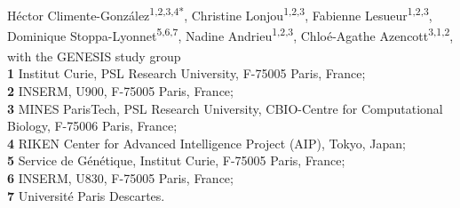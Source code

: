\documentclass[10pt,letterpaper]{article}
\providecommand{\DIFaddbegin}{} %
\providecommand{\DIFaddend}{} %
\providecommand{\DIFdelbegin}{} %
\providecommand{\DIFdelend}{} %
\newcommand{\DIFscaledelfig}{0.5}
\newlength{\DIFdelgraphicswidth} %
\newlength{\DIFdelgraphicsheight} %
\newcommand{\DIFaddincludegraphics}[2][]{{\color{blue}\fbox{\DIFOincludegraphics[#1]{#2}}}} %
\newcommand{\DIFdelincludegraphics}[2][]{%
\sbox{\DIFdelgraphicsbox}{\DIFOincludegraphics[#1]{#2}}%
\settoboxwidth{\DIFdelgraphicswidth}{\DIFdelgraphicsbox} %
\settoboxtotalheight{\DIFdelgraphicsheight}{\DIFdelgraphicsbox} %
\scalebox{\DIFscaledelfig}{%
\parbox[b]{\DIFdelgraphicswidth}{\usebox{\DIFdelgraphicsbox}\\[-\baselineskip] \rule{\DIFdelgraphicswidth}{0em}}\llap{\resizebox{\DIFdelgraphicswidth}{\DIFdelgraphicsheight}{%
\setlength{\unitlength}{\DIFdelgraphicswidth}%
\begin{picture}(1,1)%
\thicklines\linethickness{2pt} %
{\color[rgb]{1,0,0}\put(0,0){\framebox(1,1){}}}%
{\color[rgb]{1,0,0}\put(0,0){\line( 1,1){1}}}%
{\color[rgb]{1,0,0}\put(0,1){\line(1,-1){1}}}%
\end{picture}%
}\hspace*{3pt}}} %
} %
\DeclareRobustCommand{\DIFaddbegin}{\DIFOaddbegin \let\includegraphics\DIFaddincludegraphics} %
\DeclareRobustCommand{\DIFaddend}{\DIFOaddend \let\includegraphics\DIFOincludegraphics} %
\DeclareRobustCommand{\DIFdelbegin}{\DIFOdelbegin \let\includegraphics\DIFdelincludegraphics} %
\DeclareRobustCommand{\DIFdelend}{\DIFOaddend \let\includegraphics\DIFOincludegraphics} %
\begin{document}
\vspace*{0.2in}

\begin{flushleft}
{\Large
\textbf\DIFdelbegin %
\DIFdelend \DIFaddbegin {} \DIFaddend %
}
\newline
\\
Héctor Climente-González\textsuperscript{1,2,3,4*}, 
Christine Lonjou\textsuperscript{1,2,3}, 
Fabienne Lesueur\textsuperscript{1,2,3},
Dominique Stoppa-Lyonnet\textsuperscript{5,6,7\textcurrency}, 
Nadine Andrieu\textsuperscript{1,2,3}, 
Chloé-Agathe Azencott\textsuperscript{3,1,2},
with the GENESIS study group\textsuperscript{\textpilcrow}
\\
\bigskip
\textbf{1} Institut Curie, PSL Research University, F-75005 Paris, France;\\
\textbf{2} INSERM, U900, F-75005 Paris, France;\\
\textbf{3} MINES ParisTech, PSL Research University, CBIO-Centre for Computational Biology, F-75006 Paris, France;\\
\textbf{4} RIKEN Center for Advanced Intelligence Project (AIP), Tokyo, Japan; \\
\textbf{5} Service de Génétique, Institut Curie, F-75005 Paris, France;\\
\textbf{6} INSERM, U830, F-75005 Paris, France;\\
\textbf{7} Université Paris Descartes.\\
\bigskip

% 
%


\end{flushleft}
\end{document}
